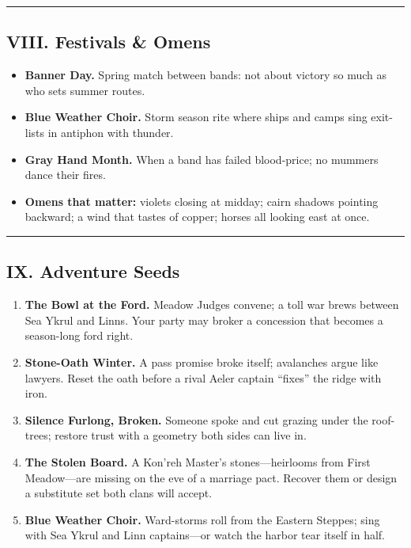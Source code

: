 \documentclass[11pt,letterpaper]{article}
\begin{document}
\medskip\hrule\medskip

\subsection{VIII. Festivals \& Omens}

\begin{itemize}[leftmargin=*]
  \item \textbf{Banner Day.} Spring match between bands: not about victory so much as who sets summer routes.
  \item \textbf{Blue Weather Choir.} Storm season rite where ships and camps sing exit-lists in antiphon with thunder.
  \item \textbf{Gray Hand Month.} When a band has failed blood-price; no mummers dance their fires.
  \item \textbf{Omens that matter:} violets closing at midday; cairn shadows pointing backward; a wind that tastes of copper; horses all looking east at once.
\end{itemize}

\medskip\hrule\medskip

\subsection{IX. Adventure Seeds}

\begin{enumerate}[leftmargin=*]
  \item \textbf{The Bowl at the Ford.} Meadow Judges convene; a toll war brews between Sea Ykrul and Linns. Your party may broker a concession that becomes a season-long ford right.
  \item \textbf{Stone-Oath Winter.} A pass promise broke itself; avalanches argue like lawyers. Reset the oath before a rival Aeler captain ``fixes'' the ridge with iron.
  \item \textbf{Silence Furlong, Broken.} Someone spoke and cut grazing under the roof-trees; restore trust with a geometry both sides can live in.
  \item \textbf{The Stolen Board.} A Kon'reh Master's stones---heirlooms from First Meadow---are missing on the eve of a marriage pact. Recover them or design a substitute set both clans will accept.
  \item \textbf{Blue Weather Choir.} Ward-storms roll from the Eastern Steppes; sing with Sea Ykrul and Linn captains---or watch the harbor tear itself in half.
\end{enumerate}
\end{document}
